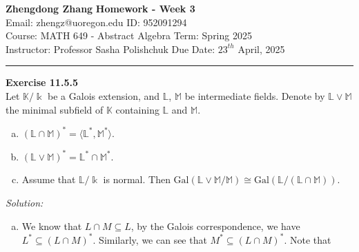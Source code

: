 \documentclass[a4paper, 12pt]{article}
\newenvironment{problem}[2][Exercise]
    { \begin{mdframed}[backgroundcolor=gray!20] \textbf{#1 #2} \\}
    {  \end{mdframed}}
\newenvironment{solution}
    {\textit{Solution:}}
    {}
\newcommand{\la}{\langle}
\newcommand{\ra}{\rangle}
\newcommand{\Gal}{\text{Gal}}
\begin{document}
\noindent
\large\textbf{Zhengdong Zhang} \hfill \textbf{Homework - Week 3}   \\
Email: zhengz@uoregon.edu \hfill ID: 952091294 \\
\normalsize Course: MATH 649 - Abstract Algebra  \hfill Term: Spring 2025\\
Instructor: Professor Sasha Polishchuk \hfill Due Date: $23^{th}$ April, 2025 \\
\noindent\rule{7in}{2.8pt}



\begin{problem}{11.5.5}
Let \(\mathbb{K}/\Bbbk\) be a Galois extension, and \(\mathbb{L}\), \(\mathbb{M}\) be intermediate fields. Denote by \(\mathbb{L}\vee \mathbb{M}\) the minimal subfield of \(\mathbb{K}\) containing 
\(\mathbb{L}\) and \(\mathbb{M}\). 
\begin{enumerate}[(a)]
\item \((\mathbb{L}\cap \mathbb{M})^*=\la \mathbb{L}^*,\mathbb{M}^*\ra\).
\item \((\mathbb{L}\vee \mathbb{M})^*=\mathbb{L}^*\cap \mathbb{M}^*\).
\item Assume that \(\mathbb{L}/\Bbbk\) is normal. Then \(\Gal(\mathbb{L}\vee \mathbb{M}/\mathbb{M})\cong \Gal(\mathbb{L}/(\mathbb{L}\cap \mathbb{M}))\).
\end{enumerate}
\end{problem}
\begin{solution}
\begin{enumerate}[(a)]
\item We know that \(L\cap M\subseteq L\), by the Galois correspondence, we have \(L^*\subseteq (L\cap M)^*\). Similarly, we can see that \(M^*\subseteq (L\cap M)^*\). Note that \(\)
\end{enumerate}
\end{solution}
\end{document}
